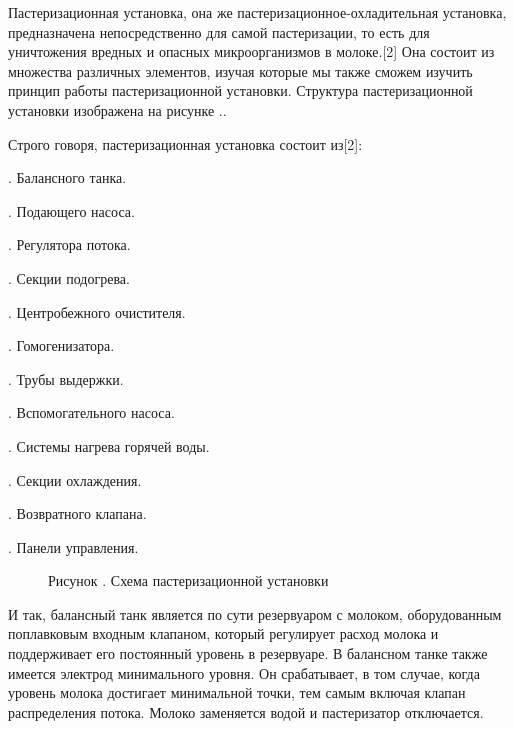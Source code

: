 {\gostFont

  \par \redline Пастеризационная установка, она же пастеризационное-охладительная установка, предназначена непосредственно для самой пастеризации, то есть для уничтожения вредных и опасных микроорганизмов в молоке.[2] Она состоит из множества различных элементов, изучая которые мы также сможем изучить принцип работы пастеризационной установки. Структура пастеризационной установки изображена на рисунке \thechaptercntr .\theimagecntr.

  \par \redline Строго говоря, пастеризационная установка состоит из[2]:

  \par {}. Балансного танка.
  \par {}. Подающего насоса.
  \par {}. Регулятора потока.
  \par {}. Секции подогрева.
  \par {}. Центробежного очистителя.
  \par {}. Гомогенизатора.
  \par {}. Трубы выдержки.
  \par {}. Вспомогательного насоса.
  \par {}. Системы нагрева горячей воды.
  \par {}. Секции охлаждения.
  \par {}. Возвратного клапана.
  \par {}. Панели управления.

  \begin{figure}
    \centering
    \def\svgwidth{\textwidth}
    
    \caption*{\gostFont Рисунок \thechaptercntr .\theimagecntr \spc {--} Схема пастеризационной установки}
    \label{fig:PUSStructure}
  \end{figure} \addtocounter{imagecntr}{1}

  \par \redline И так, балансный танк является по сути резервуаром с молоком, оборудованным поплавковым входным клапаном, который регулирует расход молока и поддерживает его постоянный уровень в резервуаре. В балансном танке также имеется электрод минимального уровня. Он срабатывает, в том случае, когда уровень молока достигает минимальной точки, тем самым включая клапан распределения потока. Молоко заменяется водой и пастеризатор отключается.

}
